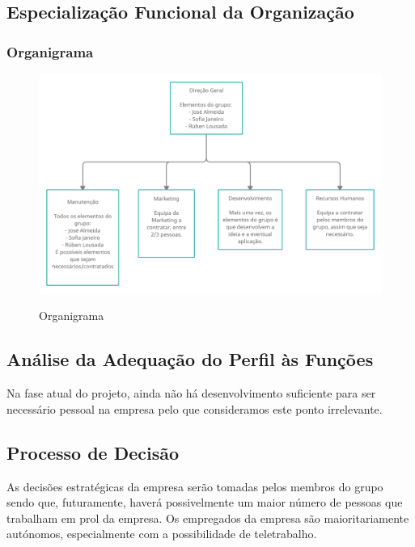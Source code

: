 \documentclass[11pt]{article}
\begin{document}
	\large
	\subsection{Especialização Funcional da Organização}
	\subsubsection{Organigrama}
	
	\normalsize
	
	\begin{figure}[h]
		\includegraphics[width=1\textwidth,keepaspectratio]{organigrama}
		\label{fig:organigrama}
		\centering
		\caption{Organigrama}
	\end{figure}
	
	
	\large
	\subsection{Análise da Adequação do Perfil às Funções}
	
	\normalsize
	
	Na fase atual do projeto, ainda não há desenvolvimento suficiente para ser necessário
	pessoal na empresa pelo que consideramos este ponto irrelevante.
	
	
	\large
	\subsection{Processo de Decisão}
	
	\normalsize
	
	As decisões estratégicas da empresa serão tomadas pelos membros do grupo sendo que, futuramente, haverá possivelmente um maior número de pessoas que trabalham em prol da empresa. Os empregados da empresa são maioritariamente autónomos, especialmente com a possibilidade de teletrabalho. 
	
\end{document}
